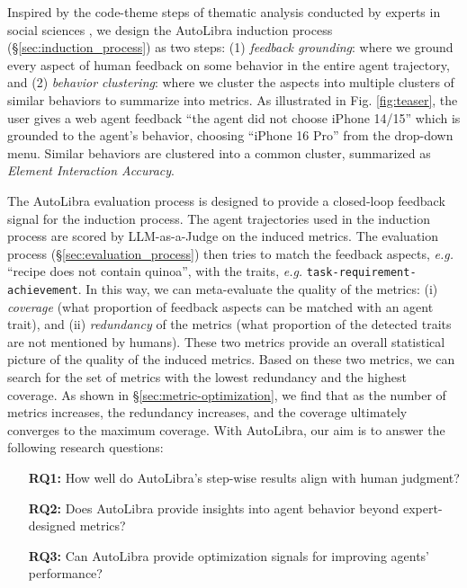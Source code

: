 \documentclass[../main.tex]{subfiles}
\begin{document}
Inspired by the code-theme steps of thematic analysis conducted by experts in
social sciences \citep{braun2006using}, we design the AutoLibra induction
process (\S\ref{sec:induction_process}) as two steps: (1) \emph{feedback
grounding}: where we ground every aspect of human feedback on some behavior in
the entire agent trajectory, and (2) \emph{behavior clustering}: where we cluster
the aspects into multiple clusters of similar behaviors to summarize into metrics.
As illustrated in Fig. \ref{fig:teaser}, the user gives a web agent feedback ``the
agent did not choose iPhone 14/15'' which is grounded to the agent's behavior, choosing
``iPhone 16 Pro'' from the drop-down menu. Similar behaviors are clustered into
a common cluster, summarized as \textit{Element Interaction Accuracy}.

The AutoLibra evaluation process is designed to provide a closed-loop feedback
signal for the induction process. The agent trajectories used in the induction process
are scored by LLM-as-a-Judge \citep{zheng2023judging} on the induced metrics. The
evaluation process (\S\ref{sec:evaluation_process}) then tries to match the
feedback aspects, \emph{e.g.} ``recipe does not contain quinoa'', with the traits,
\emph{e.g.} \texttt{task-requirement-\\achievement}. In this way, we can meta-evaluate
the quality of the metrics: (i) \emph{coverage} (what proportion of feedback aspects
can be matched with an agent trait), and (ii) \emph{redundancy} of the metrics (what
proportion of the detected traits are not mentioned by humans). These two metrics
provide an overall statistical picture of the quality of the induced metrics.
Based on these two metrics, we can search for the set of metrics with the lowest
redundancy and the highest coverage. As shown in \S\ref{sec:metric-optimization},
we find that as the number of metrics increases, the redundancy increases, and
the coverage ultimately converges to the maximum coverage. With AutoLibra, our
aim is to answer the following research questions:
\vspace{-8pt}
\begin{itemize}
	\setlength{\itemsep}{0em}

	\item[\textbf{RQ1:}] How well do AutoLibra's step-wise results align with human
		judgment?

	\item[\textbf{RQ2:}] Does AutoLibra provide insights into agent behavior beyond
		expert-designed metrics?

	\item[\textbf{RQ3:}] Can AutoLibra provide optimization signals for
		improving agents' performance?
\end{itemize}
\vspace{-8pt}
\end{document}

